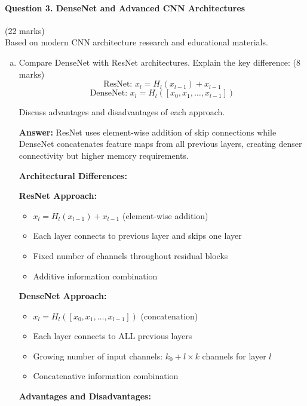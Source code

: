 \documentclass[12pt]{article}
\newcommand{\answer}[1]{{\color{answercolor}\textbf{Answer:} #1}}
\newcommand{\explanation}[1]{{\color{explanationcolor}#1}}
\begin{document}
\newpage
\paragraph{Question 3. DenseNet and Advanced CNN Architectures}\hfill (22 marks)\\
Based on modern CNN architecture research and educational materials.

\begin{enumerate}[(a)]
    \item Compare DenseNet with ResNet architectures. Explain the key difference: \hfill (8 marks)
    $$\text{ResNet: } x_l = H_l(x_{l-1}) + x_{l-1}$$
    $$\text{DenseNet: } x_l = H_l([x_0, x_1, \ldots, x_{l-1}])$$
    
    Discuss advantages and disadvantages of each approach.
    
    \answer{ResNet uses element-wise addition of skip connections while DenseNet concatenates feature maps from all previous layers, creating denser connectivity but higher memory requirements.}
    
    \explanation{
    \textbf{Architectural Differences:}
    
    \textbf{ResNet Approach:}
    \begin{itemize}
        \item $x_l = H_l(x_{l-1}) + x_{l-1}$ (element-wise addition)
        \item Each layer connects to previous layer and skips one layer
        \item Fixed number of channels throughout residual blocks
        \item Additive information combination
    \end{itemize}
    
    \textbf{DenseNet Approach:}
    \begin{itemize}
        \item $x_l = H_l([x_0, x_1, \ldots, x_{l-1}])$ (concatenation)
        \item Each layer connects to ALL previous layers
        \item Growing number of input channels: $k_0 + l \times k$ channels for layer $l$
        \item Concatenative information combination
    \end{itemize}
    
    \textbf{Advantages and Disadvantages:}
    
}
\end{enumerate}
\end{document}
